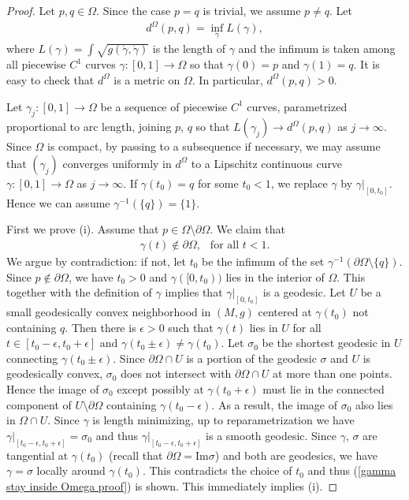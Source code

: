 \documentclass[12pt]{amsart}
\numberwithin{equation}{section}
\theoremstyle{remark}
\begin{document}
	\begin{proof}
		Let $p, q\in \Omega$. Since the case $p=q$ is trivial, we assume $p\neq q$. Let 
		\begin{align*}
			d^\Omega (p, q) = \inf_\gamma L(\gamma),
		\end{align*}
		where $L(\gamma) = \int \sqrt{g(\dot\gamma, \dot\gamma)}$ is the length of $\gamma$ and the infimum is taken among all piecewise $C^1$ curves $\gamma : [0,1]\to \Omega$ so that $\gamma(0) =p$ and $\gamma(1) =q$. It is easy to check that $d^\Omega$ is a metric on $\Omega$. In particular, $d^\Omega (p, q) >0$. 
		
		Let $\gamma_j : [0,1]\to \Omega$ be a sequence of piecewise $C^1$ curves, parametrized proportional to arc length, joining $p$, $q$ so that $L(\gamma_j) \to d^\Omega(p, q)$ as $j\to \infty$. Since $\Omega$ is compact, by passing to a subsequence if necessary, we may assume that $(\gamma_j)$ converges uniformly in $d^\Omega$ to a Lipschitz continuous curve $\gamma: [0,1]\to \Omega$ as $j\to\infty$. If $\gamma(t_0) = q$ for some $t_0< 1$, we replace $\gamma$ by $\gamma |_{[0,t_0]}$. Hence we can assume $\gamma ^{-1} (\{q\}) = \{1\}$. 
		
		First we prove (i). Assume that $p \in \Omega \setminus \partial \Omega$. We claim that 
		\begin{align} \label{gamma stay inside Omega proof}\gamma(t) \notin \partial \Omega, \ \ \text{ for all }t<1. 
		\end{align}
		We argue by contradiction: if not, let $t_0$ be the infimum of the set $\gamma^{-1} (\partial \Omega\setminus\{q\})$. Since $p\notin \partial \Omega$, we have $t_0 >0$ and $\gamma([0,t_0))$ lies in the interior of $\Omega$. This together with the definition of $\gamma$ implies that $\gamma|_{[0,t_0]}$ is a geodesic. Let $U$ be a small geodesically convex neighborhood in $(M, g)$ centered at $\gamma (t_0)$ not containing $q$. Then there is $\epsilon>0$ such that $\gamma(t)$ lies in $U$ for all $t\in [t_0-\epsilon, t_0+\epsilon]$ and $\gamma(t_0\pm \epsilon) \neq \gamma(t_0)$. Let $\sigma_0$ be the shortest geodesic in $U$ connecting $\gamma (t_0 \pm \epsilon)$. Since $\partial \Omega \cap U$ is a portion of the geodesic $\sigma$ and $U$ is geodesically convex, $\sigma_0$ does not intersect with $\partial \Omega \cap U$ at more than one points. Hence the image of $\sigma_0$ except possibly at $\gamma(t_0+\epsilon)$ must lie in the connected component of $U\setminus \partial \Omega$ containing $\gamma(t_0 - \epsilon)$. As a result, the image of $\sigma_0$ also lies in $\Omega \cap U$. Since $\gamma$ is length minimizing, up to reparametrization we have $\gamma|_{[t_0-\epsilon, t_0 + \epsilon]} = \sigma_0$ and thus $\gamma|_{[t_0-\epsilon, t_0+ \epsilon]}$ is a smooth geodesic. Since $\gamma$, $\sigma$ are tangential at $\gamma(t_0)$ (recall that $\partial \Omega = \mathrm{Im}\sigma$) and both are geodesics, we have $\gamma = \sigma$ locally around $\gamma(t_0)$. This contradicts the choice of $t_0$ and thus (\ref{gamma stay inside Omega proof}) is shown. This immediately implies (i). 
		

\end{proof}
\end{document}
